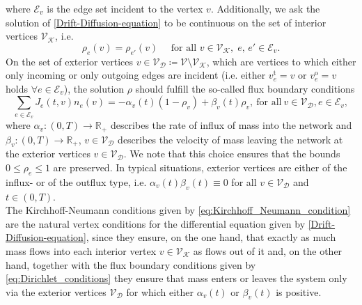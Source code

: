 where $\mathcal{E}_v$ is the edge set incident to the vertex $v$. Additionally, we ask the solution of \cref{Drift-Diffusion-equation} to be continuous on the set of interior vertices $\mathcal{V}_\mathcal{K}$, i.e. 
\begin{equation}
    \label{continuous on vertices}
    \rho_e(v) = \rho_{e'}(v) \quad \text{ for all }v \in \mathcal{V}_\mathcal{K},\; e,\,e' \in \mathcal{E}_v.
\end{equation}
On the set of exterior vertices $v \in \mathcal{V}_\mathcal{D} \coloneqq \mathcal{V} \setminus \mathcal{V}_\mathcal{K}$, which are vertices to which either only incoming or only outgoing edges are incident (i.e. either $v^{\operatorname{t}}_{e} = v$ or $v^{\operatorname{o}}_{e} = v$ holds $\forall e \in \mathcal{E}_v$), the solution $\rho$ should fulfill the so-called flux boundary conditions
\begin{equation}
    \label{eq:Dirichlet_conditions}
    \sum_{e\in \mathcal{E}_v}J_e(t, v) n_e (v)=-\alpha_v(t) (1-\rho_v) + \beta_v(t) \rho_v,\ \text{for all}\ v \in \mathcal{V}_\mathcal{D}, e \in \mathcal{E}_v,
\end{equation}
where $\alpha_v \colon (0,T) \to \mathbb{R}_{+}$ describes the rate of influx of mass into the network and $\beta_v \colon (0,T) \to \mathbb{R}_{+}$, ${v \in \mathcal{V}_\mathcal{D}}$ describes the velocity of mass leaving the network at the exterior vertices $v \in \mathcal{V}_\mathcal{D}$. We note that this choice ensures that the bounds $0 \leq \rho_e \leq 1$ are preserved. In typical situations, exterior vertices are either of the influx- or of the outflux type, i.e. $\alpha_v(t) \beta_v(t) \equiv 0$ for all $v \in \mathcal{V}_\mathcal{D}$ and $t \in (0,T)$. \\
The Kirchhoff-Neumann conditions given by \cref{eq:Kirchhoff_Neumann_condition} are the natural vertex conditions for the differential equation given by \cref{Drift-Diffusion-equation}, since they ensure, on the one hand, that exactly as much mass flows into each interior vertex $v \in \mathcal{V}_{\mathcal{K}}$ as flows out of it and, on the other hand, together with the flux boundary conditions given by \cref{eq:Dirichlet_conditions} they ensure that mass enters or leaves the system only via the exterior vertices $\mathcal{V}_\mathcal{D}$ for which either $\alpha_v(t)$ or $\beta_v(t)$ is positive. \\

